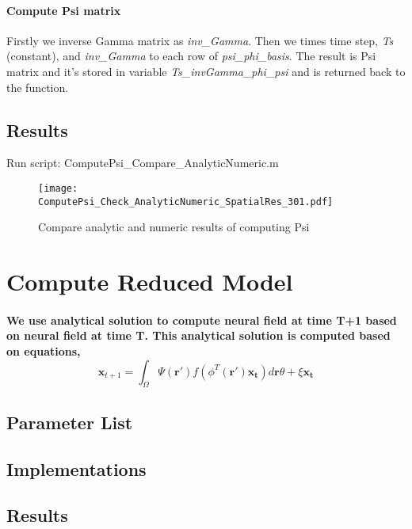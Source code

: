 \documentclass[a4paper, 12pt, english]{article}
\begin{document}
\paragraph{Compute Psi matrix\newline}
Firstly we inverse Gamma matrix as \textit{inv\_Gamma}. Then we times time step, \textit{Ts} (constant), and \textit{inv\_Gamma} to each row of \textit{psi\_phi\_basis}.
The result is Psi matrix and it's stored in variable \textit{Ts\_invGamma\_phi\_psi} and is returned back to the function.

\subsection{Results}
Run script: ComputePsi\_Compare\_AnalyticNumeric.m
\begin{figure}[H]
\centering
\texttt{[image: ComputePsi\_Check\_AnalyticNumeric\_SpatialRes\_301.pdf]}
\caption{Compare analytic and numeric results of computing Psi}
\end{figure}
\newpage




\section{Compute Reduced Model}
\paragraph{We use analytical solution to compute neural field at time T+1 based on
neural field at time T.\newline
This analytical solution is computed based on equations,
$$\boldsymbol{x}_{t+1}=\int_{\Omega}\Psi(\boldsymbol{r}\prime)f(\phi^{T}(\boldsymbol{r\prime})\boldsymbol{x_t})d\boldsymbol{r}\theta + \xi\boldsymbol{x_t} $$}


\subsection{Parameter List}
\subsection{Implementations}
\subsection{Results}

\newpage
\end{document}

